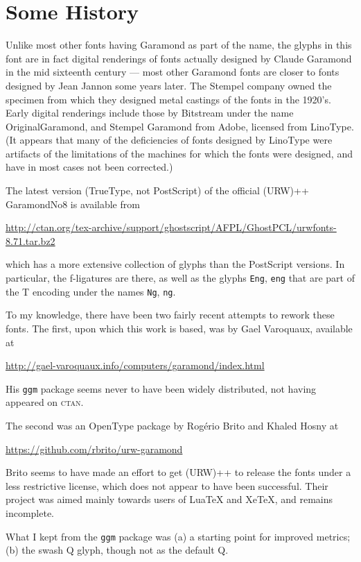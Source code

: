 \documentclass[11pt]{article}
\begin{document}
\section{Some History}
Unlike most other fonts having Garamond as part of the name, the glyphs in this font are in fact digital renderings of fonts actually designed by Claude Garamond in the mid sixteenth century --- most other Garamond fonts are closer to fonts designed by Jean Jannon some years later. The Stempel company owned the specimen from which they designed metal castings of the fonts in the 1920's. Early digital renderings include those by Bitstream under the name OriginalGaramond, and Stempel Garamond from Adobe,  licensed from LinoType. (It appears that many of the deficiencies of fonts designed by LinoType were artifacts of the limitations of the machines for which the fonts were designed, and have in most cases not been corrected.) 

The latest version (TrueType, not PostScript) of the official (URW)++ GaramondNo8 is available from

\url{http://ctan.org/tex-archive/support/ghostscript/AFPL/GhostPCL/urwfonts-8.71.tar.bz2}

which has a more extensive collection of glyphs than the PostScript versions. In particular, the f-ligatures are there, as well as the glyphs \texttt{Eng}, \texttt{eng} that are part of the T encoding under the names \texttt{Ng}, \texttt{ng}.

To my knowledge, there have been two fairly recent attempts to rework these fonts. The first, upon which this work is based, was by Gael Varoquaux, available at

\url{http://gael-varoquaux.info/computers/garamond/index.html}

His \texttt{ggm} package seems never to have been widely distributed, not having appeared on \textsc{ctan}. 

The second was an OpenType package by Rog\'erio Brito and Khaled Hosny at

\url{https://github.com/rbrito/urw-garamond}

Brito seems to have made an effort to get (URW)++ to release the fonts under a less restrictive license, which  does not appear to have been successful.
Their project was aimed mainly towards users of LuaTeX and XeTeX, and remains incomplete.

What I kept from the \texttt{ggm} package was (a) a starting point for improved metrics; (b) the swash Q glyph, though not as the default Q. 
\end{document}
